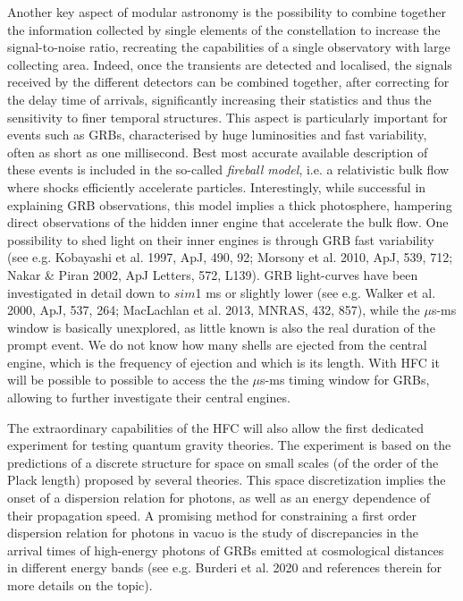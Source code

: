 \documentclass[]{spie}  %
\begin{document}
Another key aspect of modular astronomy is the possibility to combine together the information collected by single elements of the constellation to increase the signal-to-noise ratio, recreating the capabilities of a single observatory with large collecting area. Indeed, once the transients are detected and localised, the signals received by the different detectors can be combined together, after correcting for the delay time of arrivals, significantly increasing their statistics and thus the sensitivity to finer temporal structures. This aspect is particularly important for events such as GRBs,  characterised by huge luminosities and fast variability, often as short as one millisecond. Best most accurate available description of these events is included in the so-called \emph{fireball model}, i.e. a relativistic bulk flow where shocks efficiently accelerate particles. Interestingly, while successful in explaining GRB observations, this model implies a thick photosphere, hampering direct observations of the hidden inner engine that accelerate the bulk flow. One possibility to shed light on their inner engines is through GRB fast variability (see e.g. Kobayashi et al. 1997, ApJ, 490, 92; Morsony et al. 2010, ApJ, 539, 712; Nakar \& Piran 2002, ApJ Letters, 572, L139). GRB light-curves have been investigated in detail down to $sim$1 ms or slightly lower (see e.g. Walker et al. 2000, ApJ, 537, 264; MacLachlan et al. 2013, MNRAS, 432, 857), while the $\mu$s-ms window is basically unexplored, as little known is also the real duration of the prompt event. We do not know how many shells are ejected from the central engine, which is the frequency of ejection and which is its length. With HFC it will be possible to possible to access the the $\mu$s-ms timing window for GRBs, allowing to further investigate their central engines.


The extraordinary capabilities of the HFC will also allow the first dedicated experiment for testing quantum gravity theories. The experiment is based on the predictions of a discrete structure for space on small scales (of the order of the Plack length) proposed by several theories. This space discretization implies the onset of a dispersion relation for photons, as well as an energy dependence of their propagation speed. A promising method for constraining a first order dispersion relation for photons in vacuo is the study of discrepancies in the arrival times of high-energy photons of GRBs emitted at cosmological distances in different energy bands (see e.g. Burderi et al. 2020 and references therein for more details on the topic).
\end{document}
